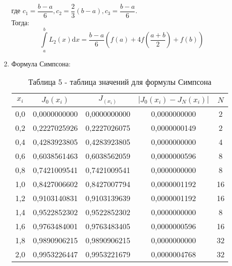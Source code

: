 \documentclass[14pt]{article}
\begin{document}
\begin{enumerate}[label = \arabic*.]
\begin{enumerate}
{\begin{equation}
            \end{equation}
            где $c_1 = \dfrac{b-a}{6}, c_2 = \dfrac{2}{3}(b - a), c_3 = \dfrac{b-a}{6}.$\\
            \hfill\break
            Тогда:
            \begin{equation}
                \int\limits_{a}^{b}L_2(x)\mathrm{d}x = \frac{b-a}{6}\left(f(a) + 4f\left(\frac{a+b}{2}\right)+f(b)\right)
            \end{equation}
            \newpage
            }
            \item {Формула Симпсона:
            \begin{table}[h]
            \centering
            \begin{tabular}{|c|c|c|c|c|}
                \hline
                $x_i$ & $J_0(x_i)$ & $J_(x_i)$ & $\left|J_0(x_i) - J_N(x_i)\right|$ & $N$\\
                \hline
                0,0 & 0,0000000000 & 0,0000000000 & 0,0000000000 & 2\\
                \hline
                0,2 & 0,2227025926 & 0,2227026075 & 0,0000000149 & 2\\
                \hline
                0,4 & 0,4283923805 & 0,4283923805 & 0,0000000000 & 4\\
                \hline
                0,6 & 0,6038561463 & 0,6038562059 & 0,0000000596 & 8\\
                \hline
                0,8 & 0,7421009541 & 0,7421009541 & 0,0000000000 & 8\\
                \hline
                1,0 & 0,8427006602 & 0,8427007794 & 0,0000001192 & 16\\
                \hline
                1,2 & 0,9103140831 & 0,9103139639 & 0,0000001192 & 16\\
                \hline
                1,4 & 0,9522852302 & 0,9522852302 & 0,0000000000 & 8\\
                \hline
                1,6 & 0,9763484001 & 0,9763483405 & 0,0000000596 & 16\\
                \hline
                1,8 & 0,9890906215 & 0,9890906215 & 0,0000000000 & 32\\
                \hline
                2,0 & 0,9953226447 & 0,9953221679 & 0,0000004768 & 32\\
                \hline
            \end{tabular}
            \caption*{\small{Таблица 5 - таблица значений для формулы Симпсона}}
            \end{table}
}
\end{enumerate}
\end{enumerate}
\end{document}
